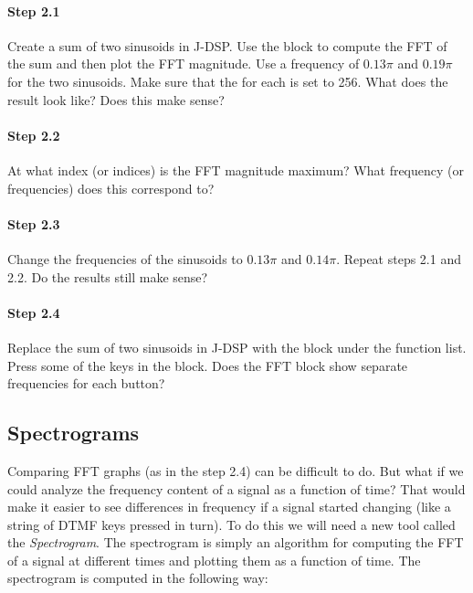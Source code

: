 \paragraph{Step 2.1} 
Create a sum of two sinusoids in J-DSP. Use the  block to
compute the FFT of the sum and then plot the FFT magnitude. Use a
frequency of $0.13\pi$ and $0.19\pi$ for the two sinusoids. Make sure
that the  for each is set to 256. What does the
result look like? Does this make sense?


\paragraph{Step 2.2} At what index (or indices) is the FFT magnitude
maximum? What frequency (or frequencies) does this correspond to?


\paragraph{Step 2.3} Change the frequencies of the sinusoids to
$0.13\pi$ and $0.14\pi$. Repeat steps 2.1 and 2.2. Do the results
still make sense?


\paragraph{Step 2.4} Replace the sum of two sinusoids in J-DSP with
the  block under the  function
list. Press some of the keys in the  block. Does the FFT
block show separate frequencies for each button?



\subsection{Spectrograms}
Comparing FFT graphs (as in the step 2.4) can be difficult to do. But
what if we could analyze the frequency content of a signal as a
function of time? That would make it easier to see differences in
frequency if a signal started changing (like a string of DTMF keys
pressed in turn). To do this we will need a new tool called the
\emph{Spectrogram}. The spectrogram is simply an algorithm for
computing the FFT of a signal at different times and plotting them as
a function of time. The spectrogram is computed in the following way:

